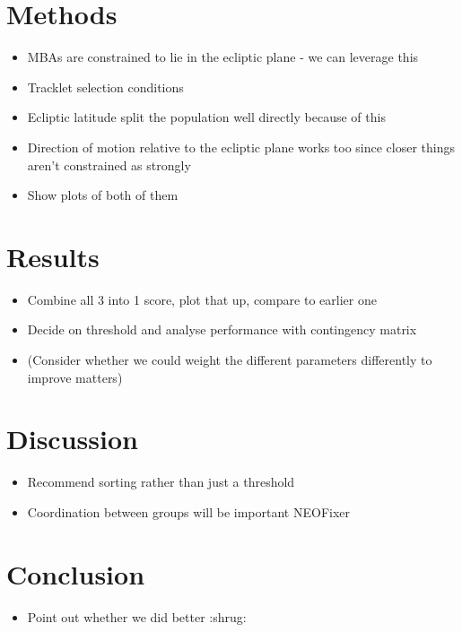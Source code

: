 \documentclass[preprint2]{aastex631}
\begin{document}
\section{Methods}

\begin{itemize}
    \item MBAs are constrained to lie in the ecliptic plane - we can leverage this
    \item Tracklet selection conditions
    \item Ecliptic latitude split the population well directly because of this
    \item Direction of motion relative to the ecliptic plane works too since closer things aren't constrained as strongly
    \item Show plots of both of them
\end{itemize}

\section{Results}

\begin{itemize}
    \item Combine all 3 into 1 score, plot that up, compare to earlier one
    \item Decide on threshold and analyse performance with contingency matrix
    \item (Consider whether we could weight the different parameters differently to improve matters)
\end{itemize}

\section{Discussion}

\begin{itemize}
    \item Recommend sorting rather than just a threshold
    \item Coordination between groups will be important NEOFixer
\end{itemize}

\section{Conclusion}

\begin{itemize}
    \item Point out whether we did better :shrug:
\end{itemize}


{}
\end{document}
